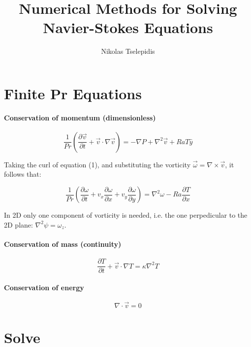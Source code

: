 \documentclass{article}
\title{Numerical Methods for Solving Navier-Stokes Equations}
\author{Nikolas Tselepidis}
\date{}
\begin{document}
\maketitle

\section{Finite Pr Equations}

\paragraph{Conservation of momentum (dimensionless)}

\begin{equation}
\frac{1}{Pr} \left( \frac{\partial \vec{v}}{\partial t} + \vec{v} \cdot \nabla \vec{v} \right) =
    - \nabla P + \nabla^2 \vec{v} + Ra T \hat{y}
\end{equation}

Taking the curl of equation (1), and substituting the vorticity $\vec{\omega} = \nabla \times \vec{v}$, it follows that:

\begin{equation}
    \frac{1}{Pr} \left( \frac{\partial \omega}{\partial t} + v_x \frac{\partial \omega}{\partial x} + v_y \frac{\partial \omega}{\partial y} \right) =
     \nabla^2 \omega - Ra \frac{\partial T}{\partial x}
\end{equation}

In 2D only one component of vorticity is needed, i.e. the one perpedicular to the 2D plane:  $\nabla^2 \psi = \omega_z$.

\paragraph{Conservation of mass (continuity)}
\begin{equation}
    \frac{\partial T}{\partial t} + \vec{v} \cdot \nabla T = \kappa \nabla^2 T
\end{equation}

\paragraph{Conservation of energy}
\begin{equation}
    \nabla \cdot \vec{v} = 0
\end{equation}


\section{Solve}
\end{document}
